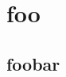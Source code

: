 \documentclass[10pt,chapterprefix=true]{scrbook}
\begin{document}
\chapter{foo}

\section{foobar}

\lipsum[1-12]
\end{document}
